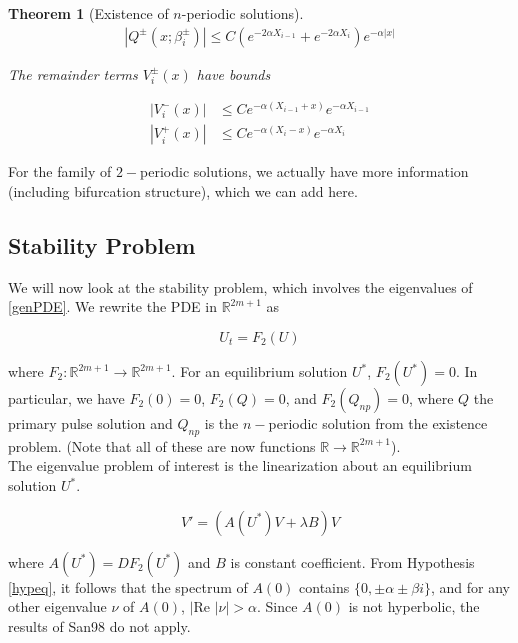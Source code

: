 \documentclass[12pt]{article}
\def\R{{\mathbb R}}
\newtheorem{theorem}{Theorem}
\begin{document}
\begin{theorem}[Existence of $n$-periodic solutions]
\begin{align*}
|Q^\pm(x; \beta_i^\pm)| \leq C (e^{-2 \alpha X_{i-1}} + e^{-2 \alpha X_i})e^{-\alpha |x|}
\end{align*} 

The remainder terms $V_i^\pm(x)$ have bounds

\begin{align}
|V_i^-(x)| &\leq C e^{-\alpha(X_{i-1} + x)}e^{-\alpha X_{i-1}} \\
|V_i^+(x)| &\leq C e^{-\alpha(X_i - x)}e^{-\alpha X_i} 
\end{align} 
\end{theorem}

For the family of $2-$periodic solutions, we actually have more information (including bifurcation structure), which we can add here.

\subsection{Stability Problem}

We will now look at the stability problem, which involves the eigenvalues of \eqref{genPDE}. We rewrite the PDE in $\R^{2m+1}$ as

\begin{equation}\label{PDEsystem}
U_t = F_2(U)
\end{equation}

where $F_2: \R^{2m+1} \rightarrow \R^{2m+1}$. For an equilibrium solution $U^*$, $F_2(U^*) = 0$. In particular, we have $F_2(0) = 0$, $F_2(Q) = 0$, and $F_2(Q_{np}) = 0$, where $Q$ the primary pulse solution and $Q_{np}$ is the $n-$periodic solution from the existence problem. (Note that all of these are now functions $\R \rightarrow \R^{2m+1}$).
\\

The eigenvalue problem of interest is the linearization about an equilibrium solution $U^*$.

\begin{equation}\label{PDEeig}
V' = ( A(U^*)V + \lambda B)V 
\end{equation}

where $A(U^*) = DF_2(U^*)$ and $B$ is constant coefficient. From Hypothesis \ref{hypeq}, it follows that the spectrum of $A(0)$ contains $\{ 0, \pm \alpha \pm \beta i\}$, and for any other eigenvalue $\nu$ of $A(0)$, $|\text{Re }|\nu| > \alpha$. Since $A(0)$ is not hyperbolic, the results of San98 do not apply.\\
\end{document}
